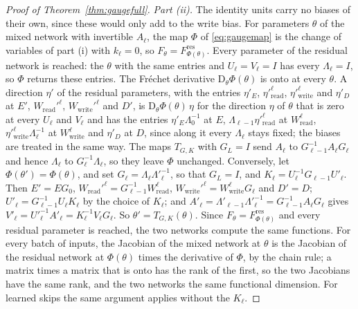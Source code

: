 \documentclass[10pt]{article}
\theoremstyle{definition}
\theoremstyle{remark}
\newcommand{\Wread}{W_{\mathrm{read}}}
\newcommand{\Wwrite}{W_{\mathrm{write}}}
\newcommand{\Der}{\mathrm{D}}
\begin{document}
\begin{proof}[Proof of Theorem~\ref{thm:gaugefull}]
\emph{Part (ii).} The identity units carry no biases of their own, since these would only add to the write bias. For parameters $\theta$ of the mixed network with invertible $A_\ell$, the map $\Phi$ of \cref{eq:gaugemap} is the change of variables of part (i) with $k_\ell = 0$, so $F_\theta = F^{\mathrm{res}}_{\Phi(\theta)}$. Every parameter of the residual network is reached: the $\theta$ with the same entries and $U_\ell = V_\ell = I$ has every $\Lambda_\ell = I$, so $\Phi$ returns these entries. The Fr\'echet derivative $\Der_\theta\Phi(\theta)$ is onto at every $\theta$. A direction $\eta'$ of the residual parameters, with the entries $\eta'_E$, $\eta'^{\ell}_{\mathrm{read}}$, $\eta'^{\ell}_{\mathrm{write}}$ and $\eta'_D$ at $E'$, $\Wread'^{\ell}$, $\Wwrite'^{\ell}$ and $D'$, is $\Der_\theta\Phi(\theta)\,\eta$ for the direction $\eta$ of $\theta$ that is zero at every $U_\ell$ and $V_\ell$ and has the entries $\eta'_E\Lambda_0^{-1}$ at $E$, $\Lambda_{\ell-1}\eta'^{\ell}_{\mathrm{read}}$ at $\Wread^{\ell}$, $\eta'^{\ell}_{\mathrm{write}}\Lambda_\ell^{-1}$ at $\Wwrite^{\ell}$ and $\eta'_D$ at $D$, since along it every $\Lambda_\ell$ stays fixed; the biases are treated in the same way. The maps $T_{G,K}$ with $G_L = I$ send $A_\ell$ to $G_{\ell-1}^{-1}A_\ell G_\ell$ and hence $\Lambda_\ell$ to $G_\ell^{-1}\Lambda_\ell$, so they leave $\Phi$ unchanged. Conversely, let $\Phi(\theta') = \Phi(\theta)$, and set $G_\ell = \Lambda_\ell\Lambda'^{-1}_\ell$, so that $G_L = I$, and $K_\ell = U_\ell^{-1}G_{\ell-1}U'_\ell$. Then $E' = EG_0$, $\Wread'^{\ell} = G_{\ell-1}^{-1}\Wread^{\ell}$, $\Wwrite'^{\ell} = \Wwrite^{\ell}G_\ell$ and $D' = D$; $U'_\ell = G_{\ell-1}^{-1}U_\ell K_\ell$ by the choice of $K_\ell$; and $A'_\ell = \Lambda'_{\ell-1}\Lambda'^{-1}_\ell = G_{\ell-1}^{-1}A_\ell G_\ell$ gives $V'_\ell = U'^{-1}_\ell A'_\ell = K_\ell^{-1}V_\ell G_\ell$. So $\theta' = T_{G,K}(\theta)$. Since $F_\theta = F^{\mathrm{res}}_{\Phi(\theta)}$ and every residual parameter is reached, the two networks compute the same functions. For every batch of inputs, the Jacobian of the mixed network at $\theta$ is the Jacobian of the residual network at $\Phi(\theta)$ times the derivative of $\Phi$, by the chain rule; a matrix times a matrix that is onto has the rank of the first, so the two Jacobians have the same rank, and the two networks the same functional dimension. For learned skips the same argument applies without the $K_\ell$.


\end{proof}
\end{document}
